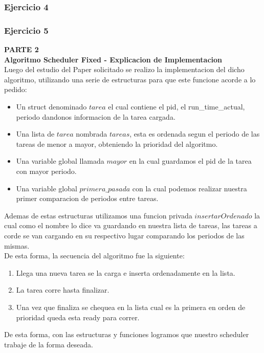 \subsubsection[Resolución Ejercicio 4]{Ejercicio 4}

\subsubsection[Resolución Ejercicio 5]{Ejercicio 5}

\textbf{PARTE 2}\\

\textbf{Algoritmo Scheduler Fixed - Explicacion de Implementacion}\\

Luego del estudio del Paper solicitado se realizo la implementacion del dicho algoritmo,
utilizando una serie de estructuras para que este funcione acorde a lo pedido:

\begin{itemize}
 \item Un struct denominado $tarea$ el cual contiene el pid, el run\_time\_actual, periodo dandonos
 informacion de la tarea cargada.
 \item Una lista de $tarea$ nombrada $tareas$, esta es ordenada segun el periodo de las tareas
 de menor a mayor, obteniendo la prioridad del algoritmo.
 \item Una variable global llamada $mayor$ en la cual guardamos el pid de la tarea con mayor
 periodo.
 \item Una variable global $primera\_pasada$ con la cual podemos realizar nuestra primer 
 comparacion de periodos entre tareas.
\end{itemize}

Ademas de estas estructuras utilizamos una funcion privada $insertarOrdenado$ la cual como el
nombre lo dice va guardando en nuestra lista de tareas, las tareas a corde se van cargando en su
respectivo lugar comparando los periodos de las mismas.\\
De esta forma, la secuencia del algoritmo fue la siguiente:

\begin{enumerate}
 \item Llega una nueva tarea se la carga e inserta ordenadamente en la lista.
 \item La tarea corre hasta finalizar.
 \item Una vez que finaliza se chequea en la lista cual es la primera en orden de prioridad queda
 esta ready para correr.
 \end{enumerate}

De esta forma, con las estructuras y funciones logramos que nuestro scheduler trabaje de la forma
deseada.
